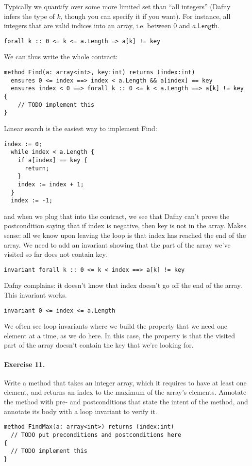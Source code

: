 \documentclass[11pt]{article}
\begin{document}
Typically we quantify over some more limited set than ``all integers'' (Dafny infers the type of
$k$, though you can specify it if you want). For instance, all integers that are valid indices into an array,
i.e. between 0 and $a.\mathsf{Length}$.
\begin{lstlisting}[language=dafny]
  forall k :: 0 <= k <= a.Length => a[k] != key
\end{lstlisting}
We can thus write the whole contract:
\begin{lstlisting}[language=dafny]
method Find(a: array<int>, key:int) returns (index:int)
  ensures 0 <= index ==> index < a.Length && a[index] == key
  ensures index < 0 ==> forall k :: 0 <= k < a.Length ==> a[k] != key
{
    // TODO implement this
}
\end{lstlisting}
Linear search is the easiest way to implement \textsf{Find}:
\begin{lstlisting}[language=dafny]
  index := 0;
  while index < a.Length {
    if a[index] == key {
      return;
    }
    index := index + 1;
  }
  index := -1;
\end{lstlisting}
and when we plug that into the contract, we see that Dafny can't prove the postcondition
saying that if \textsf{index} is negative, then \textsf{key} is not in the array. Makes sense:
all we know upon leaving the loop is that \textsf{index} has reached the end of the array.
We need to add an invariant showing that the part of the array we've visited so far does not
contain \textsf{key}.
\begin{lstlisting}[language=dafny]
  invariant forall k :: 0 <= k < index ==> a[k] != key
\end{lstlisting}
Dafny complains: it doesn't know that \textsf{index} doesn't go off the end of the array.
This invariant works.
\begin{lstlisting}[language=dafny]
  invariant 0 <= index <= a.Length
\end{lstlisting}
We often see loop invariants where we build the property that we need one element at a time,
as we do here. In this case, the property is that the visited part of the array doesn't contain
the key that we're looking for.

\paragraph{Exercise 11.} Write a method that takes an integer array, which it requires to have
at least one element, and returns an index to the maximum of the array's elements. Annotate
the method with pre- and postconditions that state the intent of the method, and annotate
its body with a loop invariant to verify it.
\begin{lstlisting}[language=dafny]
method FindMax(a: array<int>) returns (index:int)
  // TODO put preconditions and postconditions here  
{
  // TODO implement this
}
\end{lstlisting}
\end{document}
